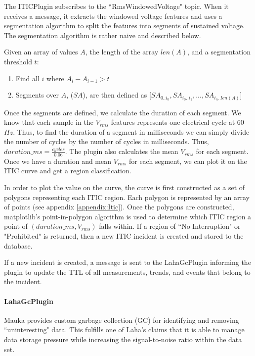 The ITICPlugin subscribes to the ``RmsWindowedVoltage" topic. When it receives a message, it extracts the windowed voltage features and uses a segmentation algorithm to split the features into segments of sustained voltage. The segmentation algorithm is rather naive and described below.

Given an array of values $A$, the length of the array $len(A)$, and a segmentation threshold $t$:
\begin{enumerate}
	\item Find all $i$ where $A_i - A_{i-1} > t$
	\item Segments over $A$, ($SA$), are then defined as [$SA_{0..i_0}, SA_{i_0..i_1}, ..., SA_{i_n..len(A)}$]
\end{enumerate}

Once the segments are defined, we calculate the duration of each segment. We know that each sample in the $V_{rms}$ features represents one electrical cycle at 60$Hz$. Thus, to find the duration of a segment in milliseconds we can simply divide the number of cycles by the number of cycles in milliseconds. Thus, $duration\_ms = \frac{cycles}{0.06}$. The plugin also calculates the mean $V_{rms}$ for each segment. Once we have a duration and mean $V_{rms}$ for each segment, we can plot it on the ITIC curve and get a region classification.

In order to plot the value on the curve, the curve is first constructed as a set of polygons representing each ITIC region. Each polygon is represented by an array of points (see appendix \ref{appendix:Itic}). Once the polygons are constructed, matplotlib's point-in-polygon algorithm is used to determine which ITIC region a point of $(duration\_ms, V_{rms})$ falls within. If a region of ``No Interruption" or "Prohibited" is returned, then a new ITIC incident is created and stored to the database. 

If a new incident is created, a message is sent to the LahaGcPlugin informing the plugin to update the TTL of all measurements, trends, and events that belong to the incident. 

\paragraph{LahaGcPlugin}
Mauka provides custom garbage collection (GC) for identifying and removing ``uninteresting" data. This fulfills one of Laha's claims that it is able to manage data storage pressure while increasing the signal-to-noise ratio within the data set.

